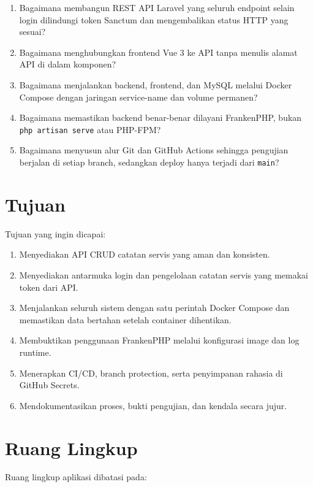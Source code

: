 \documentclass[12pt,a4paper,oneside]{book}
\begin{document}
\begin{enumerate}[leftmargin=1.2cm]
  \item Bagaimana membangun REST API Laravel yang seluruh endpoint selain login
        dilindungi token Sanctum dan mengembalikan status HTTP yang sesuai?
  \item Bagaimana menghubungkan frontend Vue 3 ke API tanpa menulis alamat API di
        dalam komponen?
  \item Bagaimana menjalankan backend, frontend, dan MySQL melalui Docker Compose
        dengan jaringan service-name dan volume permanen?
  \item Bagaimana memastikan backend benar-benar dilayani FrankenPHP, bukan
        \texttt{php artisan serve} atau PHP-FPM?
  \item Bagaimana menyusun alur Git dan GitHub Actions sehingga pengujian berjalan
        di setiap branch, sedangkan deploy hanya terjadi dari \texttt{main}?
\end{enumerate}

\section{Tujuan}

Tujuan yang ingin dicapai:

\begin{enumerate}[leftmargin=1.2cm]
  \item Menyediakan API CRUD catatan servis yang aman dan konsisten.
  \item Menyediakan antarmuka login dan pengelolaan catatan servis yang memakai
        token dari API.
  \item Menjalankan seluruh sistem dengan satu perintah Docker Compose dan
        memastikan data bertahan setelah container dihentikan.
  \item Membuktikan penggunaan FrankenPHP melalui konfigurasi image dan log runtime.
  \item Menerapkan CI/CD, branch protection, serta penyimpanan rahasia di GitHub
        Secrets.
  \item Mendokumentasikan proses, bukti pengujian, dan kendala secara jujur.
\end{enumerate}

\section{Ruang Lingkup}

Ruang lingkup aplikasi dibatasi pada:
\end{document}
